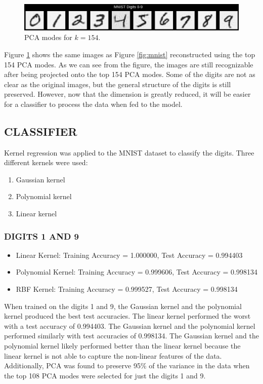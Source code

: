 \documentclass[12pt]{article}
\begin{document}
\begin{figure}[h!]
    \centering
    \includegraphics[scale=0.4]{mnist_pca.png}    
    \caption{PCA modes for $k=154$.}
    \label{fig:pca}
\end{figure}

Figure \ref{fig:pca} shows the same images as Figure \ref{fig:mnist} reconstructed using the top 154 PCA modes. 
As we can see from the figure, the images are still recognizable after being projected onto the top 154 PCA modes.
Some of the digits are not as clear as the original images, but the general structure of the digits is still preserved.
However, now that the dimension is greatly reduced, it will be easier for a classifier to process the data when 
fed to the model. \\

\subsection*{CLASSIFIER}
Kernel regression was applied to the MNIST dataset to classify the digits. Three different kernels were used:
\begin{enumerate}
    \item Gaussian kernel
    \item Polynomial kernel
    \item Linear kernel
\end{enumerate}

\subsubsection*{DIGITS 1 AND 9}

\begin{itemize}
    \item Linear Kernel: Training Accuracy = 1.000000, Test Accuracy = 0.994403 
    \item Polynomial Kernel: Training Accuracy = 0.999606, Test Accuracy = 0.998134 
    \item RBF Kernel: Training Accuracy = 0.999527, Test Accuracy = 0.998134
\end{itemize}

When trained on the digits 1 and 9, the Gaussian kernel and the polynomial kernel produced the best test accuracies.
The linear kernel performed the worst with a test accuracy of 0.994403. The Gaussian kernel and the polynomial kernel
performed similarly with test accuracies of 0.998134. The Gaussian kernel and the polynomial kernel likely performed better
than the linear kernel because the linear kernel is not able to capture the non-linear features of the data. Additionally,
PCA was found to preserve 95\% of the variance in the data when the top 108 PCA modes were selected for just the digits 1 and 9.
\end{document}

